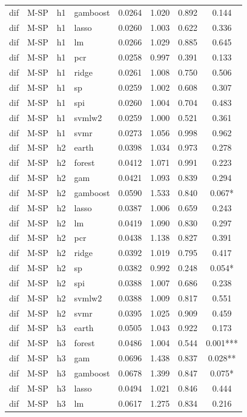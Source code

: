 \begin{ThreePartTable}
\begin{longtable}[t]{llclcccc}
dif & M-SP & h1 & gamboost & 0.0264 & 1.020 & 0.892 & 0.144\\
dif & M-SP & h1 & lasso & 0.0260 & 1.003 & 0.622 & 0.336\\
dif & M-SP & h1 & lm & 0.0266 & 1.029 & 0.885 & 0.645\\
dif & M-SP & h1 & pcr & 0.0258 & 0.997 & 0.391 & 0.133\\
dif & M-SP & h1 & ridge & 0.0261 & 1.008 & 0.750 & 0.506\\
dif & M-SP & h1 & sp & 0.0259 & 1.002 & 0.608 & 0.307\\
dif & M-SP & h1 & spi & 0.0260 & 1.004 & 0.704 & 0.483\\
dif & M-SP & h1 & svmlw2 & 0.0259 & 1.000 & 0.521 & 0.361\\
dif & M-SP & h1 & svmr & 0.0273 & 1.056 & 0.998 & 0.962\\
\addlinespace
dif & M-SP & h2 & earth & 0.0398 & 1.034 & 0.973 & 0.278\\
dif & M-SP & h2 & forest & 0.0412 & 1.071 & 0.991 & 0.223\\
dif & M-SP & h2 & gam & 0.0421 & 1.093 & 0.839 & 0.294\\
dif & M-SP & h2 & gamboost & 0.0590 & 1.533 & 0.840 & 0.067*\\
dif & M-SP & h2 & lasso & 0.0387 & 1.006 & 0.659 & 0.243\\
dif & M-SP & h2 & lm & 0.0419 & 1.090 & 0.830 & 0.297\\
dif & M-SP & h2 & pcr & 0.0438 & 1.138 & 0.827 & 0.391\\
dif & M-SP & h2 & ridge & 0.0392 & 1.019 & 0.795 & 0.417\\
dif & M-SP & h2 & sp & 0.0382 & 0.992 & 0.248 & 0.054*\\
dif & M-SP & h2 & spi & 0.0388 & 1.007 & 0.686 & 0.238\\
dif & M-SP & h2 & svmlw2 & 0.0388 & 1.009 & 0.817 & 0.551\\
dif & M-SP & h2 & svmr & 0.0395 & 1.025 & 0.909 & 0.459\\
\addlinespace
dif & M-SP & h3 & earth & 0.0505 & 1.043 & 0.922 & 0.173\\
dif & M-SP & h3 & forest & 0.0486 & 1.004 & 0.544 & 0.001***\\
dif & M-SP & h3 & gam & 0.0696 & 1.438 & 0.837 & 0.028**\\
dif & M-SP & h3 & gamboost & 0.0678 & 1.399 & 0.847 & 0.075*\\
dif & M-SP & h3 & lasso & 0.0494 & 1.021 & 0.846 & 0.444\\
dif & M-SP & h3 & lm & 0.0617 & 1.275 & 0.834 & 0.216\\

\end{longtable}
\end{ThreePartTable}

